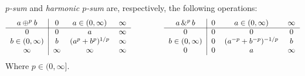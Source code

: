 \begin{definition}[$p$-Sum]
\label{$p$-Sum}
    \emph{$p$-sum} and \emph{harmonic $p$-sum} are, respectively, the following operations:
    \begin{equation*}
		\begin{tabular}{c|ccc}
			$a \psum{p} b$ & $0$ & $a \in (0,\infty)$ & $\infty$\\
			\cline{1-4}
			$0$ 			   & $0$ & $a$ 		& $\infty$\\
			$b \in (0,\infty)$ & $b$ & $(a^{p}+b^{p})^{1/p}$		& $\infty$\\
			$\infty$ 		   & $\infty$ & $\infty$ & $\infty$
		\end{tabular}
		\hspace*{10ex}
		\begin{tabular}{c|ccc}
			\textnormal{$a \phsum{p} b$} & $0$ & $a \in (0,\infty)$ & $\infty$\\
			\cline{1-4}
			$0$ 		 	   & $0$ 		& $0$ 	   & $0$\\
			$b \in (0,\infty)$ & $0$ 		& $(a^{-p}+b^{-p})^{-1/p}$	   & $b$\\
			$0$ 		   & $0$ 	& $a$ & $\infty$
		\end{tabular}
	\end{equation*}
    Where $p \in (0,\infty].$
\end{definition}


